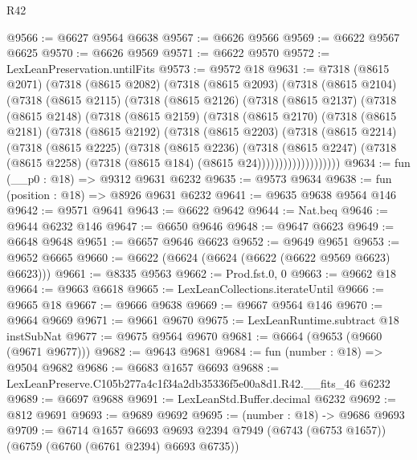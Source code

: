 \begin{lexlean}{R42}
\begin{coremodule}
{@9566 := @6627 @9564 @6638
@9567 := @6626 @9566
@9569 := @6622 @9567 @6625
@9570 := @6626 @9569
@9571 := @6622 @9570
@9572 := LexLeanPreservation.untilFits
@9573 := @9572 @18
@9631 := @7318
    (@8615 @2071)
    (@7318
      (@8615 @2082)
      (@7318
        (@8615 @2093)
        (@7318
          (@8615 @2104)
          (@7318
            (@8615 @2115)
            (@7318
              (@8615 @2126)
              (@7318
                (@8615 @2137)
                (@7318
                  (@8615 @2148)
                  (@7318
                    (@8615 @2159)
                    (@7318
                      (@8615 @2170)
                      (@7318
                        (@8615 @2181)
                        (@7318
                          (@8615 @2192)
                          (@7318
                            (@8615 @2203)
                            (@7318
                              (@8615 @2214)
                              (@7318
                                (@8615 @2225)
                                (@7318
                                  (@8615 @2236)
                                  (@7318
                                    (@8615 @2247)
                                    (@7318
                                      (@8615 @2258)
                                      (@7318 (@8615 @184) (@8615 @24)))))))))))))))))))
@9634 := fun (__p0 : @18) => @9312 @9631 @6232
@9635 := @9573 @9634
@9638 := fun (position : @18) => @8926 @9631 @6232
@9641 := @9635 @9638 @9564 @146
@9642 := @9571 @9641
@9643 := @6622 @9642
@9644 := Nat.beq
@9646 := @9644 @6232 @146
@9647 := @6650 @9646
@9648 := @9647 @6623
@9649 := @6648 @9648
@9651 := @6657 @9646 @6623
@9652 := @9649 @9651
@9653 := @9652 @6665
@9660 := @6622 (@6624 (@6624 (@6622 (@6622 @9569 @6623) @6623)))
@9661 := @8335 @9563
@9662 := Prod.fst.{0, 0}
@9663 := @9662 @18
@9664 := @9663 @6618
@9665 := LexLeanCollections.iterateUntil
@9666 := @9665 @18
@9667 := @9666 @9638
@9669 := @9667 @9564 @146
@9670 := @9664 @9669
@9671 := @9661 @9670
@9675 := LexLeanRuntime.subtract @18 instSubNat
@9677 := @9675 @9564 @9670
@9681 := @6664 (@9653 (@9660 (@9671 @9677)))
@9682 := @9643 @9681
@9684 := fun (number : @18) => @9504 @9682
@9686 := @6683 @1657 @6693
@9688 := LexLeanPreserve.C105b277a4c1f34a2db35336f5e00a8d1.R42.__fits_46 @6232
@9689 := @6697 @9688
@9691 := LexLeanStd.Buffer.decimal @6232
@9692 := @812 @9691
@9693 := @9689 @9692
@9695 := (number : @18) -> @9686 @9693
@9709 := @6714
    @1657
    @6693
    @9693
    @2394
    @7949
    (@6743 (@6753 @1657))
    (@6759 (@6760 (@6761 @2394) @6693 @6735))
}
\end{coremodule}
\end{lexlean}
